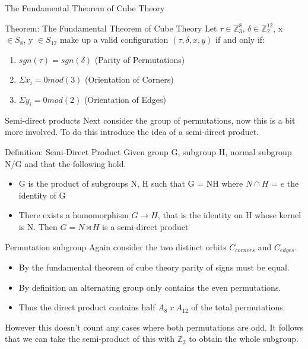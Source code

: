 \documentclass{beamer}
\begin{document}
\begin{frame}[t]{The Fundamental Theorem of Cube Theory}
\begin{block}{Theorem: The Fundamental Theorem of Cube Theory}
Let $\tau \in \mathbb{Z}_{3}^{8}$, $\delta \in \mathbb{Z}_{2}^{12}$, x $\in S_{8}$, y $\in S_{12}$ make up a valid configuration $(\tau,\delta, x, y)$ if and only if:
\begin{enumerate}
\item $sgn(\tau) = sgn(\delta)$ (Parity of Permutations)
\item $\Sigma x_{i} =0mod(3)$ (Orientation of Corners)
\item $\Sigma y_{i} =0mod(2)$ (Orientation of Edges)
\end{enumerate}
\end{block}
\end{frame}

\begin{frame}[t]{Semi-direct products}
Next consider the group of permutations, now this is a bit more involved. To do this introduce the idea of a semi-direct product.

\begin{block}{Definition: Semi-Direct Product}
Given group G, subgroup H, normal subgroup N/G and that the following hold.
\begin{itemize}
\item G is the product of subgroups N, H such that G = NH where $N \cap H$ = $e$ the identity
of G
\item There exists a homomorphism $G \rightarrow H$, that is the identity on H whose kernel is N. Then
$G =N \rtimes H$ is a semi-direct product
\end{itemize}
\end{block}
\end{frame}


\begin{frame}[t]{Permutation subgroup}
Again consider the two distinct orbits $C_{corners}$ and $C_{edges}$.
\begin{itemize}
\item By the fundamental theorem of cube theory parity of signs must be equal.
\item By definition an alternating group only contains the even permutations.
\item Thus the direct product contains half $A_8\ x\ A_{12}$  of the total permutations.
\end{itemize}
However this doesn't count any cases where both permutations are odd. It follows that we can take the semi-product of this with $\mathbb{Z}_2$ to obtain the whole subgroup.
\end{frame}
\end{document}
